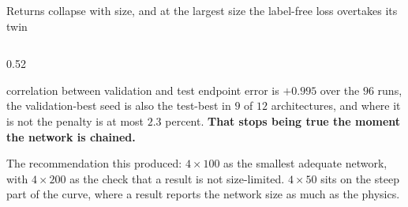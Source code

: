 \documentclass[aspectratio=169,10pt]{beamer}
\newcommand{\bad}[1]{{\color{warm}\textbf{#1}}}
\begin{document}
\begin{frame}[shrink=25]{Returns collapse with size, and at the largest size the label-free loss overtakes its twin}
\begin{columns}[T]
\begin{column}{0.52\textwidth}
\begin{itemize}
              correlation between validation and test endpoint error is
              $+0.995$ over the $96$ runs, the validation-best seed is also the
              test-best in $9$ of $12$ architectures, and where it is not the
              penalty is at most $2.3$ percent. \bad{That stops being true the
              moment the network is chained.}
      \end{itemize}
      \smallskip
      {\footnotesize The recommendation this produced: $4\times100$ as the
       smallest adequate network, with $4\times200$ as the check that a result
       is not size-limited. $4\times50$ sits on the steep part of the curve,
       where a result reports the network size as much as the physics.}
    \end{column}
  \end{columns}
\end{frame}
\end{document}
